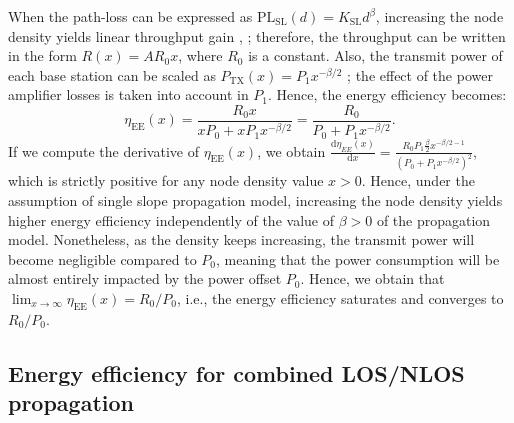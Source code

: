\documentclass[twocoumn]{IEEEtran}
\begin{document}
When the path-loss can be expressed as $\mathrm{PL}_{\mathrm{SL}}(d)=K_{\mathrm{SL}}d^{\beta}$,
increasing the node density yields linear throughput gain \cite{Galiotto2013}, \cite{Ling2012}; therefore, the throughput can be written in the form $R(x)=AR_{0}x$, where $R_0$ is a constant. Also, the transmit power of each base station
can be scaled as $P_{\mathrm{TX}}(x)=P_{1}x^{-\beta/2}$ \cite{Galiotto2013}; the effect of the power amplifier losses is taken into account in $P_1$. Hence, the energy efficiency becomes: 
\begin{equation}
\eta_{\mathrm{EE}}(x)=\frac{R_{0}x}{xP_{0}+xP_{1}x^{-\beta/2}}=\frac{R_{0}}{P_{0}+P_{1}x^{-\beta/2}}.\label{eq:eff_pathloss_1}
\end{equation}
If we compute the derivative of $\eta_{\mathrm{EE}}(x)$, we obtain
$\frac{\mathrm{d}\eta_{EE}(x)}{\mathrm{d}x}=\frac{R_{0}P_{1}\frac{\beta}{2}x^{-\beta/2-1}}{\left(P_{0}+P_{1}x^{-\beta/2}\right)^{2}}$,
which is strictly positive for any node density value $x>0$. Hence,
under the assumption of single slope propagation model, increasing
the node density yields higher energy efficiency independently of the value of $\beta>0$ of the propagation model. Nonetheless, as the density keeps increasing, the transmit power will become negligible compared to $P_0$, meaning that the power consumption will be almost entirely impacted by the power offset $P_0$. Hence, we obtain that $\lim_{x \to \infty} \eta_{\mathrm{EE}}(x) = R_0/P_0$, i.e., the energy efficiency saturates and converges to $R_0/P_0$.

\vspace{-6mm}
\subsection{Energy efficiency for combined LOS/NLOS propagation}\label{sub:Energy-efficiency-for}
\end{document}
